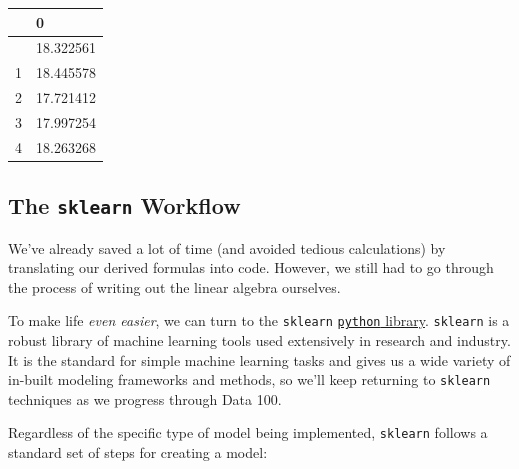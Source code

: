 \documentclass[
  letterpaper,
  DIV=11,
  numbers=noendperiod]{scrreprt}
\begin{document}
\begin{longtable}[]{@{}ll@{}}
\toprule\noalign{}
& 0 \\
\midrule\noalign{}
\endhead
\bottomrule\noalign{}
\endlastfoot
0 & 18.322561 \\
1 & 18.445578 \\
2 & 17.721412 \\
3 & 17.997254 \\
4 & 18.263268 \\
\end{longtable}

\subsection{\texorpdfstring{The \texttt{sklearn}
Workflow}{The sklearn Workflow}}\label{the-sklearn-workflow}

We've already saved a lot of time (and avoided tedious calculations) by
translating our derived formulas into code. However, we still had to go
through the process of writing out the linear algebra ourselves.

To make life \emph{even easier}, we can turn to the \texttt{sklearn}
\href{https://scikit-learn.org/stable/}{\texttt{python} library}.
\texttt{sklearn} is a robust library of machine learning tools used
extensively in research and industry. It is the standard for simple
machine learning tasks and gives us a wide variety of in-built modeling
frameworks and methods, so we'll keep returning to \texttt{sklearn}
techniques as we progress through Data 100.

Regardless of the specific type of model being implemented,
\texttt{sklearn} follows a standard set of steps for creating a model:
\end{document}
